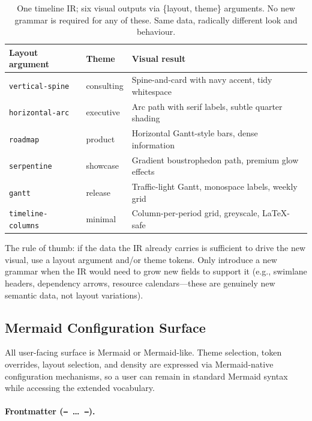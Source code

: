 \begin{table}[h]
\centering
\small
\begin{tabularx}{\textwidth}{llX}
\toprule
\textbf{Layout argument} & \textbf{Theme} & \textbf{Visual result} \\
\midrule
\texttt{vertical-spine}  & consulting   & Spine-and-card with navy accent, tidy whitespace \\
\texttt{horizontal-arc}  & executive    & Arc path with serif labels, subtle quarter shading \\
\texttt{roadmap}         & product      & Horizontal Gantt-style bars, dense information \\
\texttt{serpentine}      & showcase     & Gradient boustrophedon path, premium glow effects \\
\texttt{gantt}           & release      & Traffic-light Gantt, monospace labels, weekly grid \\
\texttt{timeline-columns}& minimal      & Column-per-period grid, greyscale, LaTeX-safe \\
\bottomrule
\end{tabularx}
\caption{One timeline IR; six visual outputs via \{layout, theme\} arguments. No new grammar
is required for any of these. Same data, radically different look and behaviour.}
\label{tab:reach-example}
\end{table}

The rule of thumb: if the data the IR already carries is sufficient to drive the new visual,
use a layout argument and/or theme tokens. Only introduce a new grammar when the IR would
need to grow new fields to support it (e.g., swimlane headers, dependency arrows, resource
calendars---these are genuinely new semantic data, not layout variations).

\subsection{Mermaid Configuration Surface}
\label{sec:themes-mermaid-surface}

All user-facing surface is Mermaid or Mermaid-like. Theme selection, token overrides,
layout selection, and density are expressed via Mermaid-native configuration mechanisms,
so a user can remain in standard Mermaid syntax while accessing the extended vocabulary.

\paragraph{Frontmatter (\texttt{---}~\ldots~\texttt{---}).}

